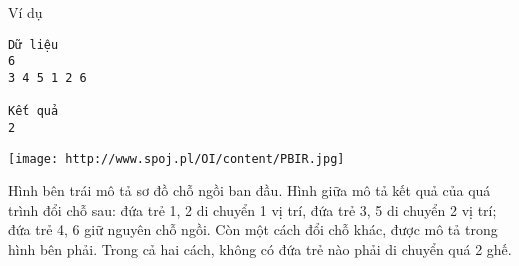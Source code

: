 Ví dụ
\begin{verbatim}
Dữ liệu
6
3 4 5 1 2 6

Kết quả
2
\end{verbatim}
\texttt{[image: http://www.spoj.pl/OI/content/PBIR.jpg]}

   Hình bên trái mô tả sơ đồ chỗ ngồi ban đầu. Hình giữa mô tả kết quả của quá trình đổi chỗ sau: đứa trẻ 1, 2 di chuyển 1 vị trí, đứa trẻ 3, 5 di chuyển 2 vị trí; đứa trẻ 4, 6 giữ nguyên chỗ ngồi. Còn một cách đổi chỗ khác, được mô tả trong hình bên phải. Trong cả hai cách, không có đứa trẻ nào phải di chuyển quá 2 ghế.